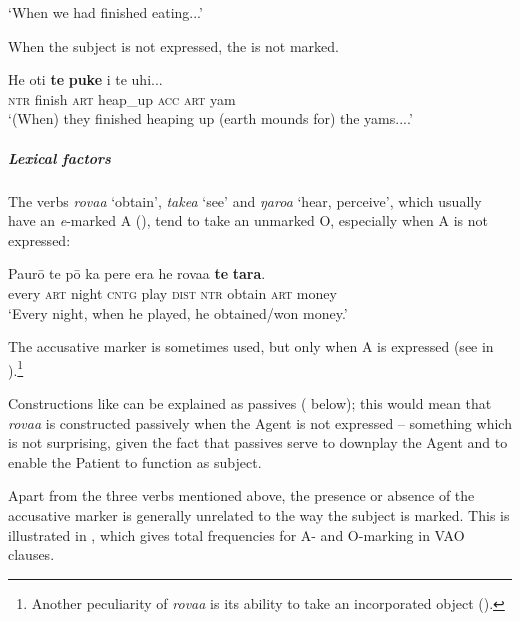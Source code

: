 \glt
‘When we had finished eating...’ \textstyleExampleref{[R157.032]} 
\z

When the subject is not expressed, the  is not marked. 

\ea\label{ex:8.38}
\gll He oti \textbf{te} \textbf{puke} i te {\ꞌ}uhi... \\
\textsc{ntr} finish \textsc{art} heap\_up \textsc{acc} \textsc{art} yam \\

\glt 
‘(When) they finished heaping up (earth mounds for) the yams....’ \textstyleExampleref{[Mtx-2-01.010]}
\z

\subparagraph{Lexical factors} The verbs \textit{rova{\ꞌ}a} ‘obtain’, \textit{take{\ꞌ}a} ‘see’ and \textit{ŋaro{\ꞌ}a} ‘hear, perceive’, which usually have an \textit{e}{}-marked A (), tend to take an unmarked O, especially when A is not expressed:

\ea\label{ex:8.39}
\gll Paurō te pō ka pere era he rova{\ꞌ}a \textbf{te} \textbf{tara}.\\
every \textsc{art} night \textsc{cntg} play \textsc{dist} \textsc{ntr} obtain \textsc{art} money\\

\glt
‘Every night, when he played, he obtained/won money.’ \textstyleExampleref{[R250.146]} 
\z

The accusative marker is sometimes used, but only when A is expressed (see  in ).\footnote{\label{fn:406}Another peculiarity of \textit{rova{\ꞌ}a} is its ability to take an incorporated object ().} 

Constructions like  can be explained as passives ( below); this would mean that \textit{rova{\ꞌ}a} is constructed passively when the Agent is not expressed – something which is not surprising, given the fact that passives serve to downplay the Agent and to enable the Patient to function as subject.

Apart from the three verbs mentioned above, the presence or absence of the accusative marker is generally unrelated to the way the subject is marked. This is illustrated in , which gives total frequencies for A- and O-marking in VAO clauses.


